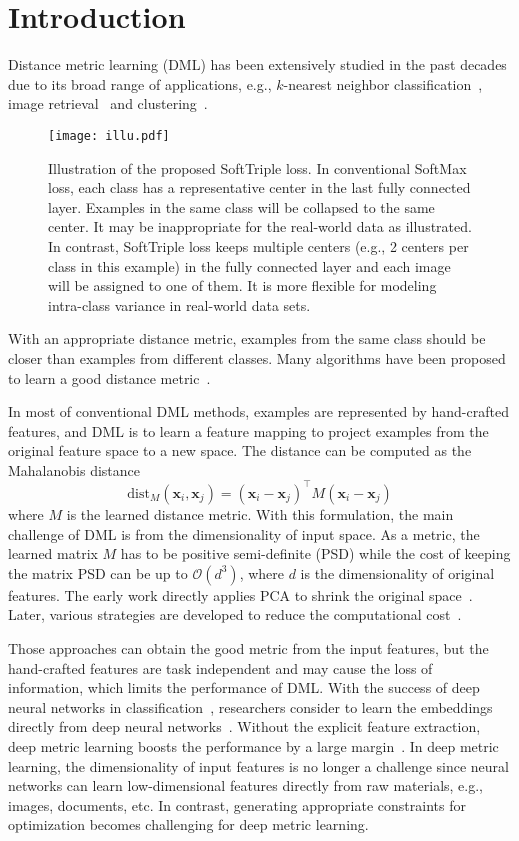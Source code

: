 \documentclass[10pt,twocolumn,letterpaper]{article}
\def \x {\mathbf{x}}
\def \OO {\mathcal{O}}
\begin{document}
\section{Introduction}
Distance metric learning (DML) has been extensively studied in the past decades due to its broad range of applications, e.g., $k$-nearest neighbor classification~\cite{WeinbergerS09}, image retrieval~\cite{SongXJS16} and clustering~\cite{XingNJR02}. 
\begin{figure}[!ht]
\centering
\texttt{[image: illu.pdf]}
\caption{Illustration of the proposed SoftTriple loss. In conventional SoftMax loss, each class has a representative center in the last fully connected layer. Examples in the same class will be collapsed to the same center. It may be inappropriate for the real-world data as illustrated. In contrast, SoftTriple loss keeps multiple centers (e.g., 2 centers per class in this example) in the fully connected layer and each image will be assigned to one of them. It is more flexible for modeling intra-class variance in real-world data sets.\label{fig:illu}}
\end{figure}
With an appropriate distance metric, examples from the same class should be closer than examples from different classes. Many algorithms have been proposed to learn a good distance metric~\cite{ParkhiVZ15,QianJY0Z15,SchroffKP15,WeinbergerS09}.

In most of conventional DML methods, examples are represented by hand-crafted features, and DML is to learn a feature mapping to project examples from the original feature space to a new space. The distance can be computed as the Mahalanobis distance~\cite{mahalanobis1936generalized}
\[\mathrm{dist}_M(\x_i,\x_j) = (\x_i-\x_j)^\top M(\x_i-\x_j)\]
where $M$ is the learned distance metric. With this formulation, the main challenge of DML is from the dimensionality of input space. As a metric, the learned matrix $M$ has to be positive semi-definite (PSD) while the cost of keeping the matrix PSD can be up to $\OO(d^3)$, where $d$ is the dimensionality of original features. The early work directly applies PCA to shrink the original space~\cite{WeinbergerS09}. Later, various strategies are developed to reduce the computational cost~\cite{QianJY0Z15,QianJZL15}.

Those approaches can obtain the good metric from the input features, but the hand-crafted features are task independent and may cause the loss of information, which limits the performance of DML. With the success of deep neural networks in classification~\cite{KrizhevskySH12}, researchers consider to learn the embeddings directly from deep neural networks~\cite{ParkhiVZ15,SchroffKP15}. Without the explicit feature extraction, deep metric learning boosts the performance by a large margin~\cite{SchroffKP15}. In deep metric learning, the dimensionality of input features is no longer a challenge since neural networks can learn low-dimensional features directly from raw materials, e.g., images, documents, etc. In contrast, generating appropriate constraints for optimization becomes challenging for deep metric learning.
\end{document}

